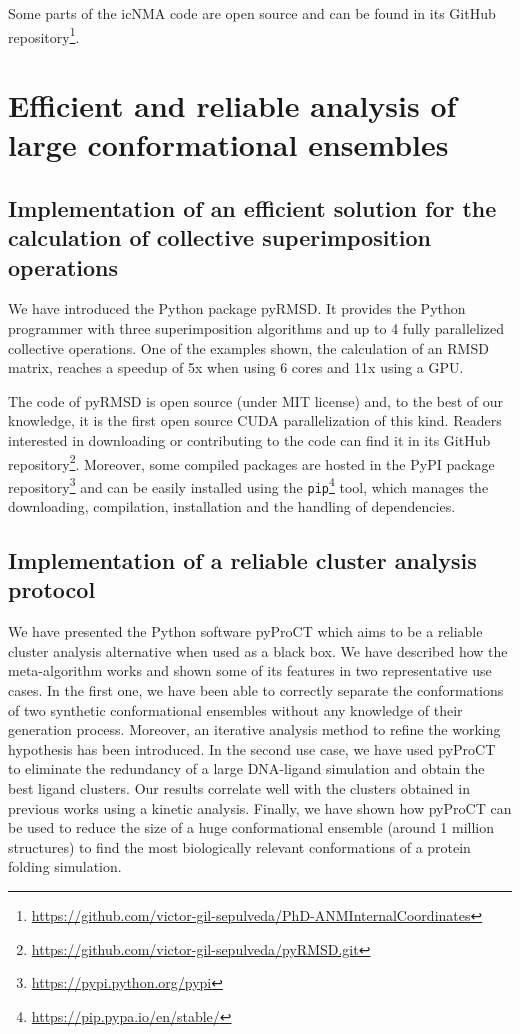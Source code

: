 Some parts of the icNMA code are open source and can be found in its GitHub repository\footnote{\url{https://github.com/victor-gil-sepulveda/PhD-ANMInternalCoordinates}}.


\section[Efficient and reliable analysis]{Efficient and reliable analysis of large conformational ensembles }

\subsection{Implementation of an efficient solution for the calculation of collective superimposition operations}
We have introduced the Python package pyRMSD. It provides the Python programmer with three superimposition algorithms and up to 4 fully parallelized collective operations. One of the examples shown, the calculation of an RMSD matrix, reaches a speedup of 5x when using 6 cores and 11x using a GPU.

The code of pyRMSD is open source (under MIT license) and, to the best of our knowledge, it is the first open source CUDA parallelization of this kind. Readers interested in downloading or contributing to the code can find it in its GitHub repository\footnote{\url{https://github.com/victor-gil-sepulveda/pyRMSD.git}}. Moreover, some compiled packages are hosted in the PyPI package repository\footnote{\url{https://pypi.python.org/pypi}} and can be easily installed using the \texttt{pip}\footnote{\url{https://pip.pypa.io/en/stable/}} tool, which manages the downloading, compilation, installation and the handling of dependencies.


\subsection{Implementation of a reliable cluster analysis protocol}

We have presented the Python software pyProCT which aims to be a reliable cluster analysis alternative when used as a black box. We have described how the meta-algorithm works and shown some of its features in two representative use cases. In the first one, we have been able to correctly separate the conformations of two synthetic conformational ensembles without any knowledge of their generation process. Moreover, an iterative analysis method to refine the working hypothesis has been introduced. 
In the second use case, we have used pyProCT to eliminate the redundancy of a large DNA-ligand simulation and obtain the best ligand clusters. Our results correlate well with the clusters obtained in previous works using a kinetic analysis. Finally, we have shown how pyProCT can be used to reduce the size of a huge conformational ensemble (around 1 million structures) to find the most biologically relevant conformations of a protein folding simulation. 

